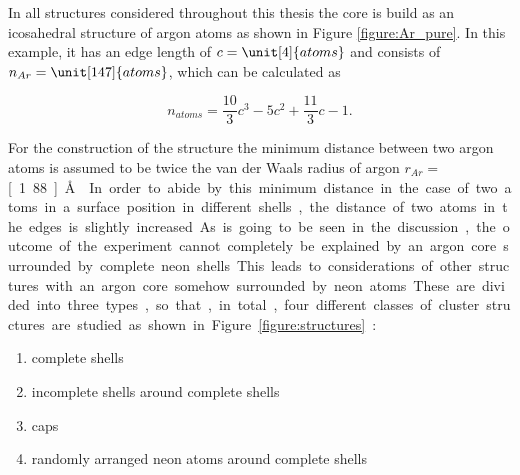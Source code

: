 In all structures considered throughout this thesis the core is build as
 an icosahedral
structure of argon atoms as shown in Figure \ref{figure:Ar_pure}.
In this example, it has an edge length
of $c=\unit[4]{atoms}$ and consists of $n_{Ar}=\unit[147]{atoms}$, which can be
calculated as \cite{Martin96}

\begin{equation}
  n_{atoms} = \frac{10}{3} c^3 - 5 c^2 + \frac{11}{3} c -1 .
\end{equation}

For the construction of the structure the minimum
distance between two argon
atoms is assumed to be twice the van der Waals
radius of argon $r_{Ar}=$ \unit[1.88]{\AA} \cite{Bondi64}. In order to abide by this
minimum distance in the case of two atoms in a surface position in different
shells, the distance of two atoms in the edges is slightly increased.

As is going to be seen in the discussion, the outcome of the experiment
cannot completely be explained by an argon core surrounded by complete neon shells.
This leads to considerations of other structures with an argon core somehow surrounded
by neon atoms. These are divided into three types, so that, in total, four
different classes of cluster structures are studied as
shown in Figure \ref{figure:structures}:

\begin{enumerate}
 \item complete shells
 \item incomplete shells around complete shells
 \item caps
 \item randomly arranged neon atoms around complete shells
\end{enumerate}

